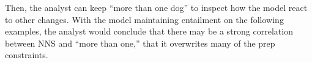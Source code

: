 Then, the analyst can keep ``more than one dog'' to inspect how the model react to other changes. 
With the model maintaining entailment on the following examples, the analyst would conclude that there may be a strong correlation between NNS and ``more than one,'' that it overwrites many of the prep constraints.


